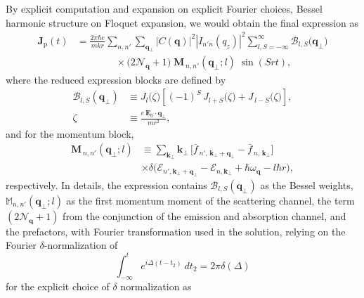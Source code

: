 \documentclass[%
 reprint,
 amsmath,amssymb,
 aps,
]{revtex4-2}
\begin{document}
By explicit computation and expansion on explicit Fourier choices, Bessel harmonic structure on Floquet expansion, we would obtain the final expression as
\begin{equation}
\begin{split}
\mathbf{J}_{\mathrm p}(t)
&=
\frac{2\pi\hbar e}{m k r}
\sum_{n,n'}
\sum_{\mathbf{q}_{\perp}}
\left|C(\mathbf q)\right|^2
\left|I_{n'n}(q_z)\right|^2
\sum_{l,S=-\infty}^{\infty}
\mathcal{B}_{l,S}\!\big(\mathbf q_{\perp}\big)
\\
&\qquad\qquad\times
\big(2\mathcal N_{\mathbf q}+1\big)
\;
\mathbf{M}_{\,n,n'}(\mathbf q_{\perp};l)\;
\sin(S r t),
\end{split}
\end{equation}
where the reduced expression blocks are defined by
\begin{equation}
\begin{split}
    \mathcal{B}_{l,S}(\mathbf q_{\perp})
&\equiv
J_{l}\!\big(\zeta\big)
\left[
(-1)^{S}\,J_{l+S}\!\big(\zeta\big)
+
J_{\,l-S}\!\big(\zeta\big)
\right],\\
\zeta& \equiv \frac{e\,\mathbf{E}_0\!\cdot\!\mathbf q_{\perp}}{m r^2},
\end{split}
\end{equation}
and for the momentum block,
\begin{equation}
\begin{split}
    \mathbf{M}_{\,n,n'}(\mathbf q_{\perp};l)
&\equiv
\sum_{\mathbf{k}_{\perp}}
\mathbf{k}_{\perp}\,
\big[
\bar f_{\,n',\,\mathbf{k}_{\perp}+\mathbf q_{\perp}}
-
\bar f_{\,n,\,\mathbf{k}_{\perp}}
\big]\\
&\times
\delta\!\big(\mathcal{E}_{n',\mathbf{k}_{\perp}+\mathbf q_{\perp}}
-
\mathcal{E}_{n,\mathbf{k}_{\perp}}
+
\hbar\omega_{\mathbf q}
-
l\hbar r\big),
\end{split}
\end{equation}
respectively. In details, the expression contains $\mathcal{B}_{l,S}(\mathbf{q}_{\perp})$ as the Bessel weights, $\mathbb{M}_{n,n'}(\mathbf{q}_{\perp};l)$ as the first momentum moment of the scattering channel, the term $(2\mathcal{N}_{\mathbf{q}}+1)$ from the conjunction of the emission and absorption channel, and the prefactors, with Fourier transformation used in the solution, relying on the Fourier $\delta$-normalization of
\begin{equation}
    \int_{-\infty}^{t} e^{i\Delta(t-t_{2})}\:dt_{2} = 2\pi\delta(\Delta)
\end{equation}
for the explicit choice of $\delta$ normalization as
\end{document}

